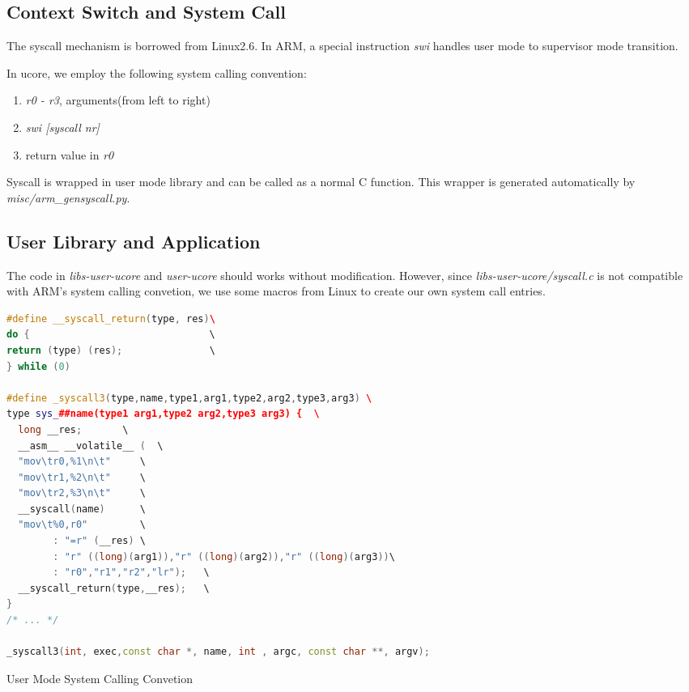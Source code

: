 \documentclass[a4paper]{article}
\begin{document}
\subsection{Context Switch and System Call}
The syscall mechanism is borrowed from Linux2.6. In ARM, a special 
instruction \emph{swi} handles user mode to supervisor mode transition.

In ucore, we employ the following system calling convention:
\begin{enumerate}
  \item \emph{r0 - r3}, arguments(from left to right)
  \item \emph{swi [syscall nr]}
  \item return value in \emph{r0}
\end{enumerate}

Syscall is wrapped in user mode library and can be called as a normal 
C function. This wrapper is generated automatically by 
\emph{misc/arm\_gensyscall.py}.

\subsection{User Library and Application}
The code in \emph{libs-user-ucore} and \emph{user-ucore}
should works without modification. However, since \emph{libs-user-ucore/syscall.c} is not compatible with ARM's 
system calling convetion, we use some macros from Linux
to create our own system call entries.

\begin{algorithm}[h]
 \begin{lstlisting}[language={C++}]
#define __syscall_return(type, res)\                                  
do {                               \                                  
return (type) (res);               \                                  
} while (0)

#define _syscall3(type,name,type1,arg1,type2,arg2,type3,arg3) \       
type sys_##name(type1 arg1,type2 arg2,type3 arg3) {  \                
  long __res;       \                                                 
  __asm__ __volatile__ (  \                                           
  "mov\tr0,%1\n\t"     \                                              
  "mov\tr1,%2\n\t"     \                                              
  "mov\tr2,%3\n\t"     \                                              
  __syscall(name)      \                                              
  "mov\t%0,r0"         \                                              
        : "=r" (__res) \                                              
        : "r" ((long)(arg1)),"r" ((long)(arg2)),"r" ((long)(arg3))\   
        : "r0","r1","r2","lr");   \                                   
  __syscall_return(type,__res);   \                                   
}
/* ... */

_syscall3(int, exec,const char *, name, int , argc, const char **, argv);

\end{lstlisting}
\caption{User Mode System Calling Convetion}
\end{algorithm}
\end{document}
